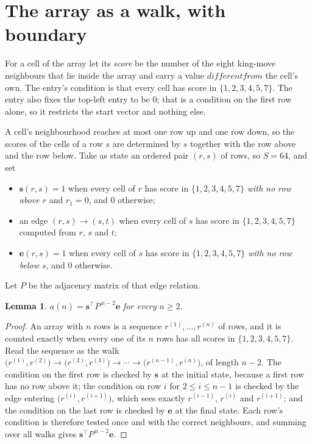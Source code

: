 \documentclass[11pt,a4paper]{article}
\theoremstyle{plain}
\newtheorem{lemma}[theorem]{Lemma}
\theoremstyle{definition}
\begin{document}
\section{The array as a walk, with boundary}

For a cell of the array let its \emph{score} be the number of the eight king-move neighbours that lie inside
the array and carry a value $different from$ the cell's own. The entry's condition is that every cell
has score in $\{1,2,3,4,5,7\}$. The entry also fixes the top-left entry to be $0$; that is a condition on the first row alone, so it restricts the start vector and nothing else.

A cell's neighbourhood reaches at most one row up and one row down, so the scores of the
cells of a row $s$ are determined by $s$ together with the row above and the row below.
Take as state an ordered pair $(r,s)$ of rows, so $S=64$, and set
\begin{itemize}
\item $\mathbf{s}(r,s)=1$ when every cell of $r$ has score in $\{1,2,3,4,5,7\}$ \emph{with no row
above $r$} and $r_1=0$, and $0$ otherwise;
\item an edge $(r,s)\to(s,t)$ when every cell of $s$ has score in $\{1,2,3,4,5,7\}$ computed from
$r$, $s$ and $t$;
\item $\mathbf{e}(r,s)=1$ when every cell of $s$ has score in $\{1,2,3,4,5,7\}$ \emph{with no row
below $s$}, and $0$ otherwise.
\end{itemize}
Let $P$ be the adjacency matrix of that edge relation.

\begin{lemma}\label{lem:walk}
$a(n)=\mathbf{s}^{\!\top}P^{\,n-2}\mathbf{e}$ for every $n\ge2$.
\end{lemma}

\begin{proof}
An array with $n$ rows is a sequence $r^{(1)},\dots,r^{(n)}$ of rows, and it is counted
exactly when every one of its $n$ rows has all scores in $\{1,2,3,4,5,7\}$. Read the sequence as the
walk $\bigl(r^{(1)},r^{(2)}\bigr)\to\bigl(r^{(2)},r^{(3)}\bigr)\to\cdots\to
\bigl(r^{(n-1)},r^{(n)}\bigr)$, of length $n-2$. The condition on the first row is
checked by $\mathbf{s}$ at the initial state, because a first row has no row above it; the
condition on row $i$ for $2\le i\le n-1$ is checked by the edge entering
$\bigl(r^{(i)},r^{(i+1)}\bigr)$, which sees exactly $r^{(i-1)}$, $r^{(i)}$ and
$r^{(i+1)}$; and the condition on the last row is checked by $\mathbf{e}$ at the final
state. Each row's condition is therefore tested once and with the correct neighbours, and
summing over all walks gives $\mathbf{s}^{\!\top}P^{\,n-2}\mathbf{e}$.
\end{proof}
\end{document}
